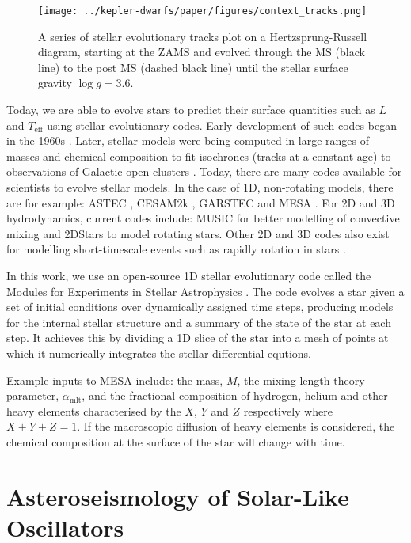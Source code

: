 \begin{figure}[ht]
    \centering
    \texttt{[image: ../kepler-dwarfs/paper/figures/context\_tracks.png]}
    \caption{A series of stellar evolutionary tracks plot on a Hertzsprung-Russell diagram, starting at the ZAMS and evolved through the MS (black line) to the post MS (dashed black line) until the stellar surface gravity $\log g=3.6$.}
    \label{fig:track}
\end{figure}

Today, we are able to evolve stars to predict their surface quantities such as $L$ and $T_\mathrm{eff}$ using stellar evolutionary codes. Early development of such codes began in the 1960s \citep[see e.g.][]{Kippenhahn.Weigert.ea1967}. Later, stellar models were being computed in large ranges of masses and chemical composition to fit isochrones (tracks at a constant age) to observations of Galactic open clusters \citep{Vandenberg1985}. Today, there are many codes available for scientists to evolve stellar models. In the case of 1D, non-rotating models, there are for example: ASTEC \citep{Christensen-Dalsgaard2008}, CESAM2k \citep{Morel.Lebreton2008}, GARSTEC \citep{Weiss.Schlattl2008} and MESA \citep{Paxton.Bildsten.ea2011}. For 2D and 3D hydrodynamics, current codes include: MUSIC \citep{Baraffe.Pratt.ea2017} for better modelling of convective mixing and 2DStars \citep{Halabi.Izzard.ea2017} to model rotating stars. Other 2D and 3D codes also exist for modelling short-timescale events such as rapidly rotation in stars \citep{Roxburgh2004}.

In this work, we use an open-source 1D stellar evolutionary code called the Modules for Experiments in Stellar Astrophysics \citep[MESA;][]{Paxton.Bildsten.ea2011}. The code evolves a star given a set of initial conditions over dynamically assigned time steps, producing models for the internal stellar structure and a summary of the state of the star at each step. It achieves this by dividing a 1D slice of the star into a mesh of points at which it numerically integrates the stellar differential equtions. 

Example inputs to MESA include: the mass, $M$, the mixing-length theory parameter, $\alpha_\mathrm{mlt}$, and the fractional composition of hydrogen, helium and other heavy elements characterised by the $X$, $Y$ and $Z$ respectively where $X+Y+Z=1$. If the macroscopic diffusion of heavy elements is considered, the chemical composition at the surface of the star will change with time.

\section{Asteroseismology of Solar-Like Oscillators}

